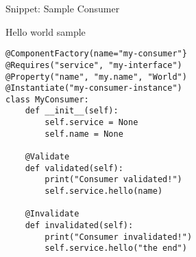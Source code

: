 \begin{frame}[fragile]{Snippet: Sample Consumer}
\begin{block}{Hello world sample}
\begin{verbatim}
@ComponentFactory(name="my-consumer"}
@Requires("service", "my-interface")
@Property("name", "my.name", "World")
@Instantiate("my-consumer-instance")
class MyConsumer:
    def __init__(self):
        self.service = None
        self.name = None

    @Validate
    def validated(self):
        print("Consumer validated!")
        self.service.hello(name)
	
    @Invalidate
    def invalidated(self):
        print("Consumer invalidated!")
        self.service.hello("the end")
\end{verbatim}
\end{block}
\end{frame}
